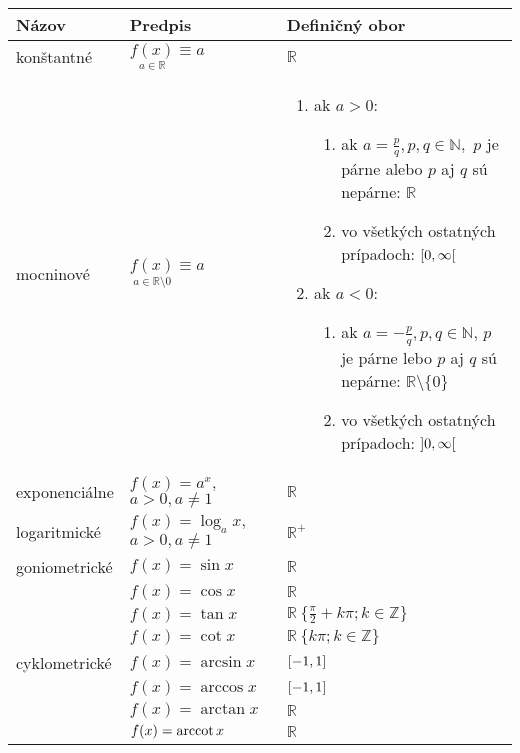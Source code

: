 \noindent
\begin{tabular}{|p{}|p{}|p{}|}
  \hline
  \textbf{Názov} & \textbf{Predpis} & \textbf{Definičný obor} \\
  \hline
  konštantné &
  $\underset{a \in \mathbb{R}}{f(x)}\equiv a$  & $\mathbb{R}$ \\
  \hline
  mocninové &
  $\underset{a \in \mathbb{R} \setminus {0}}{f(x)}\equiv a$ &
  \begin{enumerate}[leftmargin=0.5cm]
    \item ak $a>0$:
      \begin{enumerate}[leftmargin=0.5cm]
        \item ak $a=\frac{p}{q},p,q\in\mathbb{N},$ $p$ je párne alebo $p$ aj $q$
              sú nepárne: $\mathbb{R}$
        \item vo všetkých ostatných prípadoch: $\interval[open right]{0}{\infty}$
      \end{enumerate}
    \item ak $a<0$:
      \begin{enumerate}[leftmargin=0.5cm]
        \item ak $a=-\frac{p}{q},p,q\in\mathbb{N}$, $p$ je párne lebo $p$ aj $q$
              sú nepárne: $\mathbb{R} \setminus \{0\}$
        \item vo všetkých ostatných prípadoch: $\interval[open]{0}{\infty}$
      \end{enumerate}
  \end{enumerate}
  \\
  \hline
  exponenciálne
    & $f(x)=a^x, $\newline$ a>0,a\neq 1$
    & $\mathbb{R}$ \\
  \hline
  logaritmické
    & $f(x)=\log_a x,$\newline$ a>0,a\neq 1$ & $\mathbb{R}^{+}$ \\
  \hline
  goniometrické & $f(x)=\sin x$ & $\mathbb{R}$ \\
    & $f(x)=\cos x$ & $\mathbb{R}$ \\
    & $f(x)=\tan x$ & $\mathbb{R}\ \{\frac{\pi}{2}+k\pi;k\in\mathbb{Z}\}$ \\
    & $f(x)=\cot x$ & $\mathbb{R}\ \{k\pi;k\in\mathbb{Z}\}$ \\
  \hline
  cyklometrické
    & $f(x)=\arcsin x$ & $\interval{-1}{1}$ \\
    & $f(x)=\arccos x$ & $\interval{-1}{1}$ \\
    & $f(x)=\arctan x$ & $\mathbb{R}$ \\
    & $f(x)=\operatorname{arccot} x$ & $\mathbb{R}$ \\
  \hline
\end{tabular}

